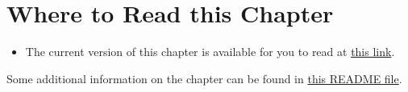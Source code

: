 \documentclass[]{book}
\providecommand{\tightlist}{%
  \setlength{\itemsep}{0pt}\setlength{\parskip}{0pt}}
\theoremstyle{definition}
\theoremstyle{definition}
\theoremstyle{definition}
\theoremstyle{remark}
\begin{document}
\section{Where to Read this Chapter}\label{where-to-read-this-chapter-1}

\begin{itemize}
\tightlist
\item
  The current version of this chapter is available for you to read at
  \href{http://htmlpreview.github.io/?https://github.com/THOMASELOVE/432-2018/blob/master/texts/chapter18/oh_smart_counts.html}{this
  link}.
\end{itemize}

Some additional information on the chapter can be found in
\href{https://github.com/THOMASELOVE/432-2018/blob/master/texts/chapter18/README.md}{this
README file}.


\end{document}
